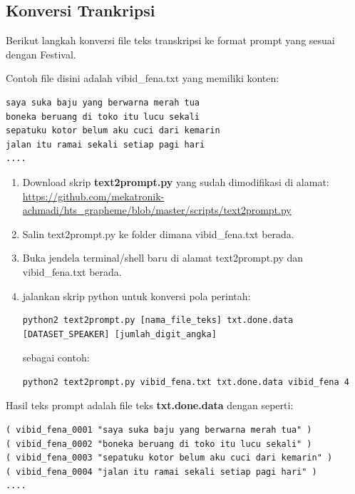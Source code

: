 \documentclass[12pt,]{article}
\begin{document}
	\newpage
	\subsection{Konversi Trankripsi}
	
	Berikut langkah konversi file teks transkripsi ke format prompt yang sesuai dengan Festival.
	
	Contoh file disini adalah vibid\_fena.txt yang memiliki konten:
	\begin{verbatim}
saya suka baju yang berwarna merah tua
boneka beruang di toko itu lucu sekali
sepatuku kotor belum aku cuci dari kemarin
jalan itu ramai sekali setiap pagi hari
....
	\end{verbatim}
	
	\begin{enumerate}
		\item Download skrip \textbf{text2prompt.py} yang sudah dimodifikasi di alamat: \\
		\url{https://github.com/mekatronik-achmadi/hts_grapheme/blob/master/scripts/text2prompt.py}
		
		\item Salin text2prompt.py ke folder dimana vibid\_fena.txt berada.
		
		\item Buka jendela terminal/shell baru di alamat text2prompt.py dan vibid\_fena.txt berada.
		
		\item jalankan skrip python untuk konversi
		pola perintah:
		\begin{verbatim}
python2 text2prompt.py [nama_file_teks] txt.done.data [DATASET_SPEAKER] [jumlah_digit_angka]
		\end{verbatim}
		
		sebagai contoh:
		\begin{verbatim}
python2 text2prompt.py vibid_fena.txt txt.done.data vibid_fena 4
		\end{verbatim}
		
	\end{enumerate}

	Hasil teks prompt adalah file teks \textbf{txt.done.data} dengan seperti:
	\begin{verbatim}
( vibid_fena_0001 "saya suka baju yang berwarna merah tua" )
( vibid_fena_0002 "boneka beruang di toko itu lucu sekali" )
( vibid_fena_0003 "sepatuku kotor belum aku cuci dari kemarin" )
( vibid_fena_0004 "jalan itu ramai sekali setiap pagi hari" )
....
	\end{verbatim}
\end{document}

